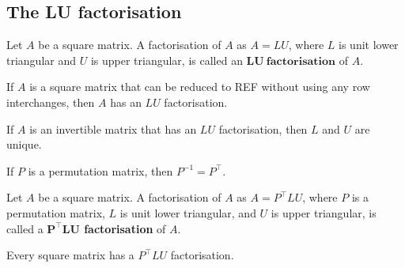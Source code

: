 \documentclass{article}
\begin{document}
\subsection{The LU factorisation}
\begin{definition}
    Let $A$ be a square matrix. A factorisation of $A$ as $A=LU$, where $L$ is unit lower triangular and $U$ is upper triangular, is called an $\mathbf{LU\: factorisation}$ of $A$.
\end{definition}
\begin{theorem}
    If $A$ is a square matrix that can be reduced to REF without using any row interchanges, then $A$ has an $LU$ factorisation.
\end{theorem}
\begin{theorem}
    If $A$ is an invertible matrix that has an $LU$ factorisation, then $L$ and $U$ are unique.
\end{theorem}
\begin{theorem}
    If $P$ is a permutation matrix, then $P^{-1}=P^\intercal$.
\end{theorem}
\begin{definition}
    Let $A$ be a square matrix. A factorisation of $A$ as $A=P^\intercal LU$, where $P$ is a permutation matrix, $L$ is unit lower triangular, and $U$ is upper triangular, is called a \textbf{$\mathbf{P^\intercal LU}$ factorisation} of $A$.
\end{definition}
\begin{theorem}
    Every square matrix has a $P^\intercal LU$ factorisation.
\end{theorem}
\end{document}
